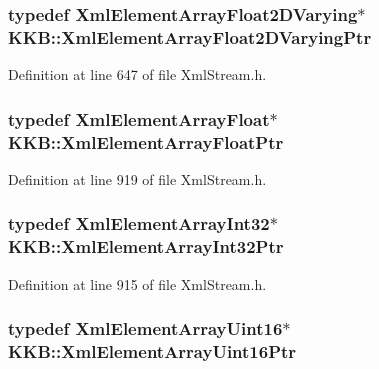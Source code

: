 \subsubsection[{\texorpdfstring{Xml\+Element\+Array\+Float2\+D\+Varying\+Ptr}{XmlElementArrayFloat2DVaryingPtr}}]{\setlength{\rightskip}{0pt plus 5cm}typedef {\bf Xml\+Element\+Array\+Float2\+D\+Varying}$\ast$ {\bf K\+K\+B\+::\+Xml\+Element\+Array\+Float2\+D\+Varying\+Ptr}}\hypertarget{namespace_k_k_b_a060f57b7f2aa1fd4339d9b270e225df8}{}\label{namespace_k_k_b_a060f57b7f2aa1fd4339d9b270e225df8}


Definition at line 647 of file Xml\+Stream.\+h.

\subsubsection[{\texorpdfstring{Xml\+Element\+Array\+Float\+Ptr}{XmlElementArrayFloatPtr}}]{\setlength{\rightskip}{0pt plus 5cm}typedef {\bf Xml\+Element\+Array\+Float}$\ast$ {\bf K\+K\+B\+::\+Xml\+Element\+Array\+Float\+Ptr}}\hypertarget{namespace_k_k_b_a0da7463a50a3050e027aab2bc7cbe47d}{}\label{namespace_k_k_b_a0da7463a50a3050e027aab2bc7cbe47d}


Definition at line 919 of file Xml\+Stream.\+h.

\subsubsection[{\texorpdfstring{Xml\+Element\+Array\+Int32\+Ptr}{XmlElementArrayInt32Ptr}}]{\setlength{\rightskip}{0pt plus 5cm}typedef {\bf Xml\+Element\+Array\+Int32}$\ast$ {\bf K\+K\+B\+::\+Xml\+Element\+Array\+Int32\+Ptr}}\hypertarget{namespace_k_k_b_a2adeb60bf20ebabd776bb452f5b08e51}{}\label{namespace_k_k_b_a2adeb60bf20ebabd776bb452f5b08e51}


Definition at line 915 of file Xml\+Stream.\+h.

\subsubsection[{\texorpdfstring{Xml\+Element\+Array\+Uint16\+Ptr}{XmlElementArrayUint16Ptr}}]{\setlength{\rightskip}{0pt plus 5cm}typedef {\bf Xml\+Element\+Array\+Uint16}$\ast$ {\bf K\+K\+B\+::\+Xml\+Element\+Array\+Uint16\+Ptr}}\hypertarget{namespace_k_k_b_a130cc537c7fef7de0b676ce72c079372}{}\label{namespace_k_k_b_a130cc537c7fef7de0b676ce72c079372}


